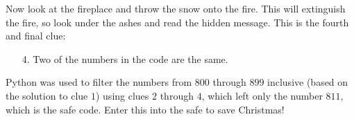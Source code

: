 \documentclass{article}
\begin{document}
{  Now look at the fireplace and throw the snow onto the fire.
  This will extinguish the fire, so look under the ashes and read the hidden message.
  This is the fourth and final clue:
  \begin{enumerate}
    \item[4.] Two of the numbers in the code are the same.
  \end{enumerate}
  Python was used to filter the numbers from $800$ through $899$ inclusive (based on the solution to clue $1$) using clues $2$ through $4$, which left only the number $811$, which is the safe code.
  Enter this into the safe to save Christmas!
}













\end{document}
